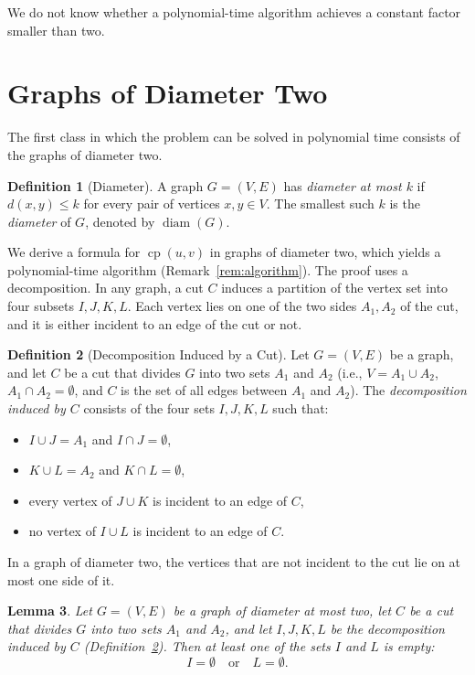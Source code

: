 \documentclass[a4paper,fleqn]{cas-sc}
\numberwithin{equation}{section}
\theoremstyle{definition}
\newtheorem{definition}{Definition}[section]
\theoremstyle{plain}
\newtheorem{lemma}[definition]{Lemma}
\theoremstyle{remark}
\newcommand{\cp}{\operatorname{cp}}                  %
\newcommand{\diam}{\operatorname{diam}}
\begin{document}
We do not know whether a polynomial-time algorithm achieves a constant factor smaller than two.

\section{Graphs of Diameter Two}
\label{sec:diameter-two}

The first class in which the problem can be solved in polynomial time consists of the graphs of diameter two.

\begin{definition}[Diameter]
\label{def:diameter}
A graph $G = (V, E)$ has \emph{diameter at most $k$} if $d(x, y) \leq k$ for every pair of vertices $x, y \in V$.
The smallest such $k$ is the \emph{diameter} of $G$, denoted by $\diam(G)$.
\end{definition}

We derive a formula for $\cp(u,v)$ in graphs of diameter two, which yields a polynomial-time algorithm (Remark~\ref{rem:algorithm}).
The proof uses a decomposition.
In any graph, a cut $C$ induces a partition of the vertex set into four subsets $I, J, K, L$.
Each vertex lies on one of the two sides $A_1, A_2$ of the cut, and it is either incident to an edge of the cut or not.

\begin{definition}[Decomposition Induced by a Cut]
\label{def:cut-decomposition}
Let $G = (V, E)$ be a graph, and let $C$ be a cut that divides $G$ into two sets $A_1$ and $A_2$ (i.e., $V = A_1 \cup A_2$, $A_1 \cap A_2 = \emptyset$, and $C$ is the set of all edges between $A_1$ and $A_2$).
The \emph{decomposition induced by $C$} consists of the four sets $I, J, K, L$ such that:
\begin{itemize}
    \item $I \cup J = A_1$ and $I \cap J = \emptyset$,
    \item $K \cup L = A_2$ and $K \cap L = \emptyset$,
    \item every vertex of $J \cup K$ is incident to an edge of $C$,
    \item no vertex of $I \cup L$ is incident to an edge of $C$.
\end{itemize}
\end{definition}

In a graph of diameter two, the vertices that are not incident to the cut lie on at most one side of it.

\begin{lemma}
\label{lem:empty-i-or-l}
Let $G = (V, E)$ be a graph of diameter at most two, let $C$ be a cut that divides $G$ into two sets $A_1$ and $A_2$, and let $I, J, K, L$ be the decomposition induced by $C$ (Definition~\ref{def:cut-decomposition}).
Then at least one of the sets $I$ and $L$ is empty:
\[
I = \emptyset \quad\text{or}\quad L = \emptyset.
\]
\end{lemma}
\end{document}
